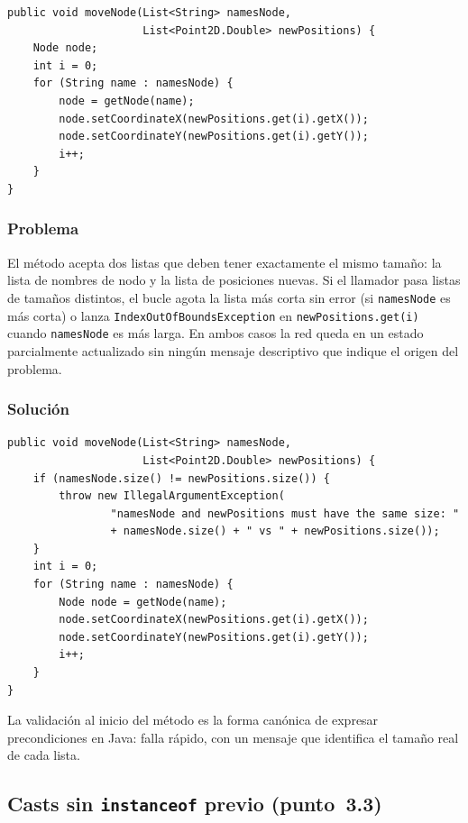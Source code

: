 \documentclass[11pt,a4paper]{article}
\newcommand{\code}[1]{\texttt{#1}}
\begin{document}
\begin{lstlisting}
public void moveNode(List<String> namesNode,
                     List<Point2D.Double> newPositions) {
    Node node;
    int i = 0;
    for (String name : namesNode) {
        node = getNode(name);
        node.setCoordinateX(newPositions.get(i).getX());
        node.setCoordinateY(newPositions.get(i).getY());
        i++;
    }
}
\end{lstlisting}

\subsubsection*{Problema}

El método acepta dos listas que deben tener exactamente el mismo
tamaño: la lista de nombres de nodo y la lista de posiciones nuevas.
Si el llamador pasa listas de tamaños distintos, el bucle agota la
lista más corta sin error (si \code{namesNode} es más corta) o lanza
\code{IndexOutOfBoundsException} en \code{newPositions.get(i)} cuando
\code{namesNode} es más larga. En ambos casos la red queda en un
estado parcialmente actualizado sin ningún mensaje descriptivo que
indique el origen del problema.

\subsubsection*{Solución}

\begin{lstlisting}
public void moveNode(List<String> namesNode,
                     List<Point2D.Double> newPositions) {
    if (namesNode.size() != newPositions.size()) {
        throw new IllegalArgumentException(
                "namesNode and newPositions must have the same size: "
                + namesNode.size() + " vs " + newPositions.size());
    }
    int i = 0;
    for (String name : namesNode) {
        Node node = getNode(name);
        node.setCoordinateX(newPositions.get(i).getX());
        node.setCoordinateY(newPositions.get(i).getY());
        i++;
    }
}
\end{lstlisting}

La validación al inicio del método es la forma canónica de expresar
precondiciones en Java: falla rápido, con un mensaje que identifica
el tamaño real de cada lista.

\subsection{Casts sin \code{instanceof} previo (punto~3.3)}
\end{document}
